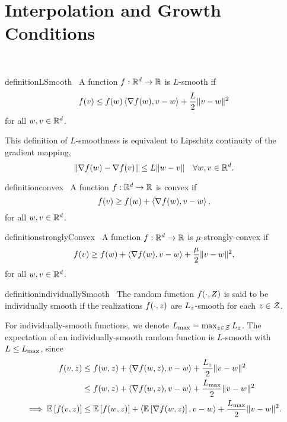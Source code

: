 
\chapter{Interpolation and Growth Conditions}~\label{ch:interpolation-gc}


\begin{restatable}[L-Smooth]{definition}{LSmooth}~\label{def:l-smooth}
    A function \( f : \mathbb{R}^d \rightarrow \mathbb{R} \) is \( L \)-smooth if  
    \[ f(v) \leq f(w) \left\langle\nabla f(w), v - w\right\rangle + \frac{L}{2}\|v - w\|^2 \]
    for all \( w,v \in \mathbb{R}^d \).
\end{restatable}
This definition of \( L \)-smoothness is equivalent to Lipschitz continuity of the gradient mapping,
\[ \|\nabla f(w) - \nabla f(v)\| \leq L \|w - v\| \quad \forall w,v \in \mathbb{R}^d. \]

\begin{restatable}[Convex]{definition}{convex}~\label{def:convex}
    A function \( f : \mathbb{R}^d \rightarrow \mathbb{R} \) is convex if  
    \[ f(v) \geq f(w) + \left\langle\nabla f(w), v - w\right\rangle, \]
    for all \( w, v \in \mathbb{R}^d \).
\end{restatable}

\begin{restatable}{definition}{stronglyConvex}~\label{def:sc}
    A function \( f : \mathbb{R}^d \rightarrow \mathbb{R} \) is \( \mu \)-strongly-convex if  
    \[ f(v) \geq f(w) + \left\langle\nabla f(w), v - w\right\rangle + \frac{\mu}{2}\|v - w\|^2, \]
    for all \( w, v \in \mathbb{R}^d \).
\end{restatable}

\begin{restatable}{definition}{individuallySmooth}~\label{def:individually-smooth}
    The random function \( f(\cdot, Z) \) is said to be individually smooth if the realizations \( f(\cdot, z) \) are \( L_z \)-smooth for each \( z \in \mathcal{Z} \).
\end{restatable}

For individually-smooth functions, we denote \( L_{\text{max}} = \max_{z \in \mathcal{Z}} L_z \). 
The expectation of an individually-smooth random function is \( L \)-smooth with \( L \leq L_{\text{max}} \), since
\begin{align*}
    f(v, z) &\leq f(w, z) + \left\langle\nabla f(w, z), v - w\right\rangle + \frac{L_z}{2} \|v - w\|^2\\
             &\leq f(w, z) + \left\langle\nabla f(w, z), v - w\right\rangle + \frac{L_{\text{max}}}{2} \|v - w\|^2\\
\implies \mathbb{E} \left[f(v, z)\right] &\leq \mathbb{E} \left[f(w, z)\right] + \left\langle\mathbb{E}\left[\nabla f(w, z)\right], v - w\right\rangle + \frac{L_{\text{max}}}{2} \|v - w\|^2.
\end{align*}

